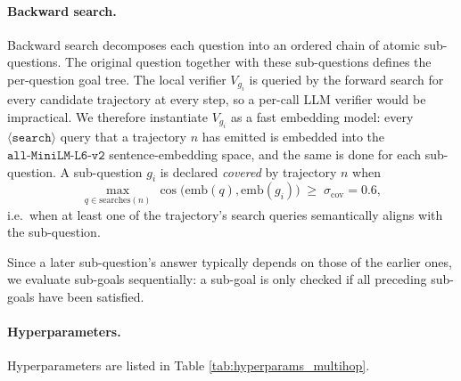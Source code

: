 \documentclass{llmxive}
\begin{document}
\paragraph{Backward search.}
Backward search decomposes each question into an ordered chain of atomic sub-questions. The
original question together with these sub-questions defines the
per-question goal tree.
The local verifier $V_{g_i}$ is queried by the forward search for
every candidate trajectory at every step, so a per-call LLM verifier would be impractical. We therefore
instantiate $V_{g_i}$ as a fast embedding model: every
$\langle\texttt{search}\rangle$ query that a trajectory $n$ has emitted
is embedded into the $\texttt{all-MiniLM-L6-v2}$ sentence-embedding
space, and the same is done for each sub-question. A sub-question
$g_i$ is declared \emph{covered} by trajectory $n$ when
\begin{equation}
\max_{q \in \mathrm{searches}(n)}\,
  \cos\bigl(\mathrm{emb}(q),\mathrm{emb}(g_i)\bigr) \;\ge\; \sigma_\mathrm{cov} = 0.6,
\end{equation}
i.e.\ when at least one of the trajectory's search queries
semantically aligns with the sub-question. 

Since a later sub-question's answer typically depends on those of the earlier ones, we evaluate sub-goals sequentially: a sub-goal is only checked if all preceding sub-goals have been satisfied.

\paragraph{Hyperparameters.}
Hyperparameters are listed in Table \ref{tab:hyperparams_multihop}.
\end{document}
